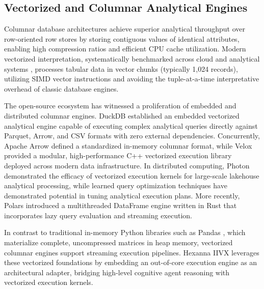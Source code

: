 \subsection{Vectorized and Columnar Analytical Engines}
Columnar database architectures \cite{idreos2022columnar} achieve superior analytical throughput over row-oriented row stores by storing contiguous values of identical attributes, enabling high compression ratios and efficient CPU cache utilization. Modern vectorized interpretation, systematically benchmarked across cloud and analytical systems \cite{kersten2022vectorized}, processes tabular data in vector chunks (typically 1,024 records), utilizing SIMD vector instructions and avoiding the tuple-at-a-time interpretative overhead of classic database engines.

The open-source ecosystem has witnessed a proliferation of embedded and distributed columnar engines. DuckDB \cite{raasveldt2023duckdb} established an embedded vectorized analytical engine capable of executing complex analytical queries directly against Parquet, Arrow, and CSV formats with zero external dependencies. Concurrently, Apache Arrow \cite{arrow2024} defined a standardized in-memory columnar format, while Velox \cite{pedreira2022velox} provided a modular, high-performance C++ vectorized execution library deployed across modern data infrastructure. In distributed computing, Photon \cite{behm2022photon} demonstrated the efficacy of vectorized execution kernels for large-scale lakehouse analytical processing, while learned query optimization techniques \cite{vldb2023queryopt} have demonstrated potential in tuning analytical execution plans. More recently, Polars \cite{polars2024} introduced a multithreaded DataFrame engine written in Rust that incorporates lazy query evaluation and streaming execution.

In contrast to traditional in-memory Python libraries such as Pandas \cite{pandas2023}, which materialize complete, uncompressed matrices in heap memory, vectorized columnar engines support streaming execution pipelines. Hexanna IIVX leverages these vectorized foundations by embedding an out-of-core execution engine as an architectural adapter, bridging high-level cognitive agent reasoning with vectorized execution kernels.

